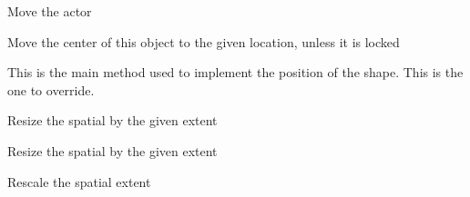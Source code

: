 \documentclass[letterpaper,10pt,english]{sphinxmanual}
\begin{document}
\begin{fulllineitems}
\begin{fulllineitems}
\end{fulllineitems}


\begin{fulllineitems}
\label{geometry:serge.geometry.Rectangle.move}
Move the actor

\end{fulllineitems}


\begin{fulllineitems}
\label{geometry:serge.geometry.Rectangle.moveTo}
Move the center of this object to the given location, unless it is locked

This is the main method used to implement the position of the 
shape. This is the one to override.

\end{fulllineitems}


\begin{fulllineitems}
\label{geometry:serge.geometry.Rectangle.resizeBy}
Resize the spatial by the given extent

\end{fulllineitems}


\begin{fulllineitems}
\label{geometry:serge.geometry.Rectangle.resizeTo}
Resize the spatial by the given extent

\end{fulllineitems}


\begin{fulllineitems}
\label{geometry:serge.geometry.Rectangle.scale}
Rescale the spatial extent

\end{fulllineitems}



\end{fulllineitems}
\end{document}
